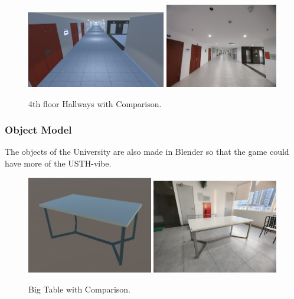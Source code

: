 \documentclass[12pt]{article}
\begin{document}
\begin{figure}[H]
    \centering
    \includegraphics[width=0.54\textwidth]{f2.png}
    \includegraphics[width=0.44\textwidth]{t4.jpg}
    \caption{4th floor Hallways with Comparison.}
\end{figure}
\clearpage
\subsubsection{Object Model}
The objects of the University are also made in Blender so that the game could have more of the USTH-vibe.
\begin{figure}[H]
    \centering
    \includegraphics[width=0.49\textwidth]{o1.png}
    \includegraphics[width=0.49\textwidth]{ban.jpg}
    \caption{Big Table with Comparison.}
\end{figure}
\end{document}
